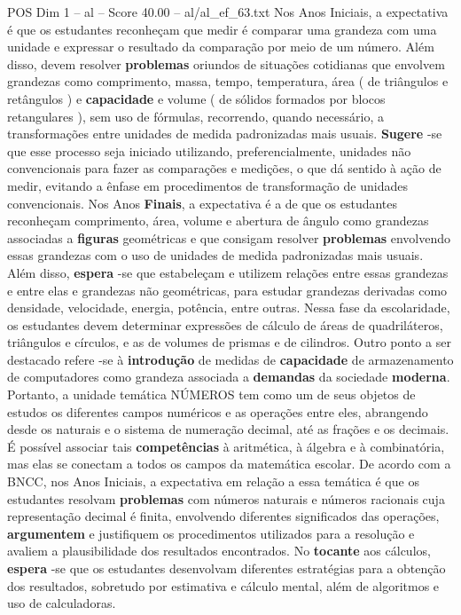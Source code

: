 \begin{textsample}{POS Dim 1 – al – Score 40.00 – al/al\_ef\_63.txt}
Nos Anos Iniciais, a expectativa é que os estudantes reconheçam que medir é comparar uma grandeza com uma unidade e expressar o resultado da comparação por meio de um número.
Além disso, devem resolver \textbf{problemas} oriundos de situações cotidianas que envolvem grandezas como comprimento, massa, tempo, temperatura, área ( de triângulos e retângulos ) e \textbf{capacidade} e volume ( de sólidos formados por blocos retangulares ), sem uso de fórmulas, recorrendo, quando necessário, a transformações entre unidades de medida padronizadas mais usuais. \textbf{Sugere} -se que esse processo seja iniciado utilizando, preferencialmente, unidades não convencionais para fazer as comparações e medições, o que dá sentido à ação de medir, evitando a ênfase em procedimentos de transformação de unidades convencionais.
Nos Anos \textbf{Finais}, a expectativa é a de que os estudantes reconheçam comprimento, área, volume e abertura de ângulo como grandezas associadas a \textbf{figuras} geométricas e que consigam resolver \textbf{problemas} envolvendo essas grandezas com o uso de unidades de medida padronizadas mais usuais.
Além disso, \textbf{espera} -se que estabeleçam e utilizem relações entre essas grandezas e entre elas e grandezas não geométricas, para estudar grandezas derivadas como densidade, velocidade, energia, potência, entre outras.
Nessa fase da escolaridade, os estudantes devem determinar expressões de cálculo de áreas de quadriláteros, triângulos e círculos, e as de volumes de prismas e de cilindros.
Outro ponto a ser destacado refere -se à \textbf{introdução} de medidas de \textbf{capacidade} de armazenamento de computadores como grandeza associada a \textbf{demandas} da sociedade \textbf{moderna}.
Portanto, a unidade temática NÚMEROS tem como um de seus objetos de estudos os diferentes campos numéricos e as operações entre eles, abrangendo desde os naturais e o sistema de numeração decimal, até as frações e os decimais.
É possível associar tais \textbf{competências} à aritmética, à álgebra e à combinatória, mas elas se conectam a todos os campos da matemática escolar.
De acordo com a BNCC, nos Anos Iniciais, a expectativa em relação a essa temática é que os estudantes resolvam \textbf{problemas} com números naturais e números racionais cuja representação decimal é finita, envolvendo diferentes significados das operações, \textbf{argumentem} e justifiquem os procedimentos utilizados para a resolução e avaliem a plausibilidade dos resultados encontrados.
No \textbf{tocante} aos cálculos, \textbf{espera} -se que os estudantes desenvolvam diferentes estratégias para a obtenção dos resultados, sobretudo por estimativa e cálculo mental, além de algoritmos e uso de calculadoras.

\end{textsample}
